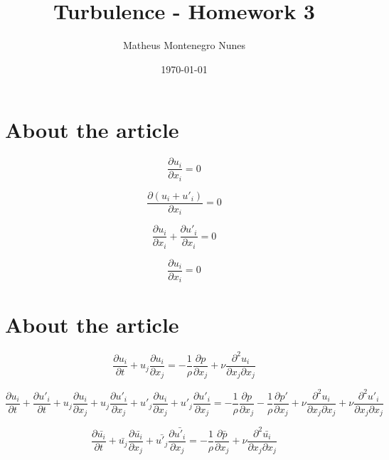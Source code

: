 \documentclass{article}
\title{Turbulence - Homework 3}
\author{Matheus Montenegro Nunes}
\date{\today}
\begin{document}
\maketitle

\section{About the article}

\begin{equation}
    \frac{\partial u_i}{\partial x_i} = 0
\end{equation}

\begin{equation}
\frac{\partial (u_i + u'_i)}{\partial x_i} = 0
\end{equation}

\begin{equation}
\frac{\partial u_i}{\partial x_i} + \frac{\partial u'_i}{\partial x_i} = 0
\end{equation}

\begin{equation}
\frac{\partial u_i}{\partial x_i}  = 0
\end{equation}

\section{About the article}

\begin{equation}
    \frac{\partial u_i}{\partial t} +
    u_j\frac{\partial u_i}{\partial x_j} = -\frac{1}{\rho}\frac{\partial p}{\partial x_j} + \nu\frac{\partial^2 u_i}{\partial x_j \partial x_j}
\end{equation}

\begin{equation}
    \frac{\partial u_i}{\partial t} 
    + \frac{\partial u'_i}{\partial t}
    + u_j\frac{\partial u_i}{\partial x_j} 
    + u_j\frac{\partial u'_i}{\partial x_j} 
    + u'_j\frac{\partial u_i}{\partial x_j}
    + u'_j\frac{\partial u'_i}{\partial x_j} = -\frac{1}{\rho}\frac{\partial p}{\partial x_j}
    -\frac{1}{\rho}\frac{\partial p'}{\partial x_j}
    + \nu\frac{\partial^2 u_i}{\partial x_j \partial x_j} 
    + \nu\frac{\partial^2 u'_i}{\partial x_j \partial x_j}
\end{equation}

\begin{equation}
    \frac{\partial \bar{u_i}}{\partial t}
    + \bar{u_j}\frac{\partial \bar{u_i}}{\partial x_j}
    + \bar{u'_j}\frac{\partial \bar{u'_i}}{\partial x_j} = -\frac{1}{\rho}\frac{\partial \bar{p}}{\partial x_j} +\nu\frac{\partial^2 \bar{u_i}}{\partial x_j \partial x_j}
\end{equation}
\end{document}
